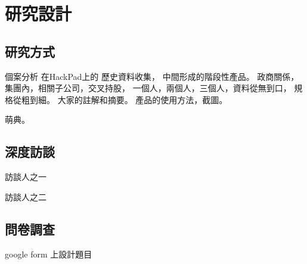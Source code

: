 \chapter{研究設計}

\section{研究方式}
個案分析
在HackPad上的
歷史資料收集，
中間形成的階段性產品。
政商關係，
集團內，相關子公司，交叉持股，
一個人，兩個人，三個人，資料從無到口，
規格從粗到細。
大家的註解和摘要。
產品的使用方法，截圖。

萌典。



\section{深度訪談}
訪談人之一

訪談人之二







\section{問卷調查}
google form 上設計題目



